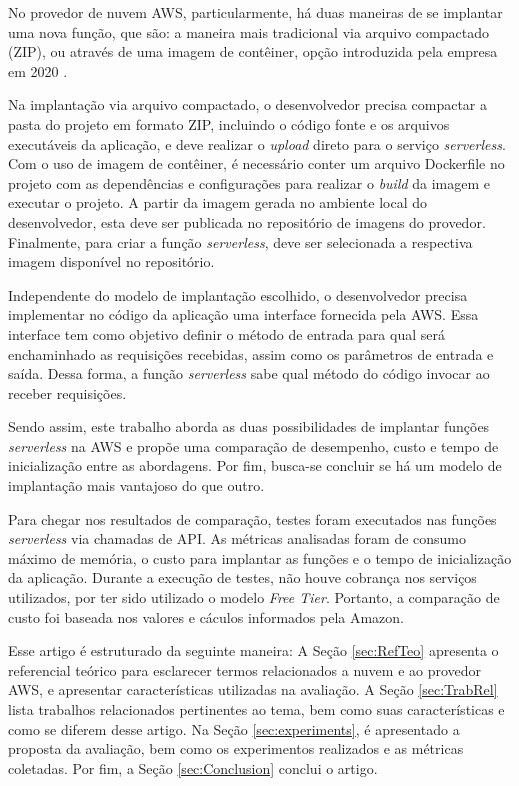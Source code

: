 \documentclass[conference]{IEEEtran}
\begin{document}
No provedor de nuvem AWS, particularmente, há duas maneiras de se implantar uma nova função, que são: a maneira mais tradicional via arquivo compactado (ZIP), ou através de uma imagem de contêiner, opção introduzida pela empresa em 2020 \cite{aws_2020_supports_container_image}.

Na implantação via arquivo compactado, o desenvolvedor precisa compactar a pasta do projeto em formato ZIP, incluindo o código fonte e os arquivos executáveis da aplicação, e deve realizar o \textit{upload} direto para o serviço \textit{serverless}. Com o uso de imagem de contêiner, é necessário conter um arquivo Dockerfile no projeto com as dependências e configurações para realizar o \textit{build} da imagem e executar o projeto. A partir da imagem gerada no ambiente local do desenvolvedor, esta deve ser publicada no repositório de imagens do provedor. Finalmente, para criar a função \textit{serverless}, deve ser selecionada a respectiva imagem disponível no repositório. 

Independente do modelo de implantação escolhido, o desenvolvedor precisa implementar no código da aplicação uma interface fornecida pela AWS. Essa interface tem como objetivo definir o método de entrada para qual será enchaminhado as requisições recebidas, assim como os parâmetros de entrada e saída. Dessa forma, a função \textit{serverless} sabe qual método do código invocar ao receber requisições.

Sendo assim, este trabalho aborda as duas possibilidades de implantar funções \textit{serverless} na AWS e propõe uma comparação de desempenho, custo e tempo de inicialização entre as abordagens. Por fim, busca-se concluir se há um modelo de implantação mais vantajoso do que outro.

Para chegar nos resultados de comparação, testes foram executados nas funções \textit{serverless} via chamadas de API. As métricas analisadas foram de consumo máximo de memória, o custo para implantar as funções e o tempo de inicialização da aplicação. Durante a execução de testes, não houve cobrança nos serviços utilizados, por ter sido utilizado o modelo \textit{Free Tier}. Portanto, a comparação de custo foi baseada nos valores e cáculos informados pela Amazon.

Esse artigo é estruturado da seguinte maneira: A Seção \ref{sec:RefTeo} apresenta o referencial teórico para esclarecer termos relacionados a nuvem e ao provedor AWS, e apresentar características utilizadas na avaliação. A Seção \ref{sec:TrabRel} lista trabalhos relacionados pertinentes ao tema, bem como suas características e como se diferem desse artigo. Na Seção \ref{sec:experiments}, é apresentado a proposta da avaliação, bem como os experimentos realizados e as métricas coletadas. Por fim, a Seção \ref{sec:Conclusion} conclui o artigo.
\end{document}
